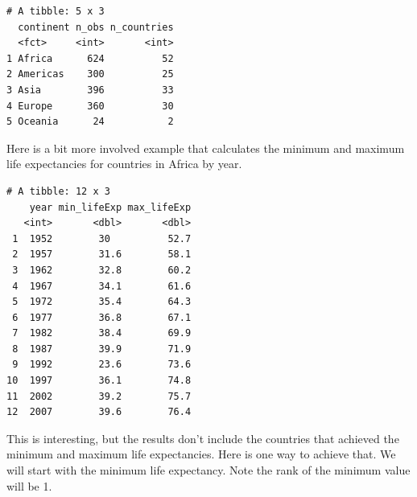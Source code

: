 \documentclass[]{krantz}
\makeatletter
\newenvironment{Shaded}{\begin{snugshade}}{\end{snugshade}}
\newcommand{\DataTypeTok}[1]{\textcolor[rgb]{0.27,0.27,0.27}{#1}}
\newcommand{\KeywordTok}[1]{\textcolor[rgb]{0.27,0.27,0.27}{\textbf{#1}}}
\newcommand{\NormalTok}[1]{#1}
\newcommand{\OperatorTok}[1]{\textcolor[rgb]{0.43,0.43,0.43}{\textbf{#1}}}
\newcommand{\StringTok}[1]{\textcolor[rgb]{0.5,0.5,0.5}{#1}}
\newenvironment{kframe}{%
\medskip{}
\setlength{\fboxsep}{.8em}
 \def\at@end@of@kframe{}%
 \ifinner\ifhmode%
  \def\at@end@of@kframe{\end{minipage}}%
  \begin{minipage}{\columnwidth}%
 \fi\fi%
 \def\FrameCommand##1{\hskip\@totalleftmargin \hskip-\fboxsep
 \colorbox{shadecolor}{##1}\hskip-\fboxsep
     \hskip-\linewidth \hskip-\@totalleftmargin \hskip\columnwidth}%
 \MakeFramed {\advance\hsize-\width
   \@totalleftmargin\z@ \linewidth\hsize
   \@setminipage}}%
 {\par\unskip\endMakeFramed%
 \at@end@of@kframe}
\renewenvironment{Shaded}{\begin{kframe}}{\end{kframe}}
\makeatother
\begin{document}
\begin{Shaded}
\end{Shaded}

\begin{verbatim}
# A tibble: 5 x 3
  continent n_obs n_countries
  <fct>     <int>       <int>
1 Africa      624          52
2 Americas    300          25
3 Asia        396          33
4 Europe      360          30
5 Oceania      24           2
\end{verbatim}

Here is a bit more involved example that calculates the minimum and maximum life expectancies for countries in Africa by year.

\begin{Shaded}
\end{Shaded}

\begin{verbatim}
# A tibble: 12 x 3
    year min_lifeExp max_lifeExp
   <int>       <dbl>       <dbl>
 1  1952        30          52.7
 2  1957        31.6        58.1
 3  1962        32.8        60.2
 4  1967        34.1        61.6
 5  1972        35.4        64.3
 6  1977        36.8        67.1
 7  1982        38.4        69.9
 8  1987        39.9        71.9
 9  1992        23.6        73.6
10  1997        36.1        74.8
11  2002        39.2        75.7
12  2007        39.6        76.4
\end{verbatim}

This is interesting, but the results don't include the countries that achieved the minimum and maximum life expectancies. Here is one way to achieve that. We will start with the minimum life expectancy. Note the rank of the minimum value will be 1.
\end{document}
